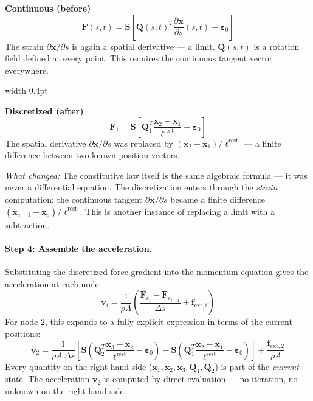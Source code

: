 \documentclass[11pt]{article}
\newcommand{\vect}[1]{\mathbf{#1}}
\newcommand{\mat}[1]{\mathbf{#1}}
\newcommand{\dds}[1]{\frac{\partial #1}{\partial s}}
\begin{document}
\begin{tcolorbox}[colback=white, colframe=black!40, title={\small Step 3 --- Continuous vs.\ discretized constitutive law}, fonttitle=\bfseries\small]
\begin{minipage}[t]{0.47\linewidth}
\centering\textbf{Continuous (before)}
\[
  \vect{F}(s, t) = \mat{S}\!\left[\mat{Q}(s,t)^T \dds{\vect{x}}(s,t) - \bm{\varepsilon}_0\right]
\]
The strain $\partial \vect{x}/\partial s$ is again a spatial derivative --- a limit.
$\mat{Q}(s,t)$ is a rotation field defined at every point.
This requires the continuous tangent vector everywhere.
\end{minipage}\hfill
\vrule width 0.4pt\hfill
\begin{minipage}[t]{0.47\linewidth}
\centering\textbf{Discretized (after)}
\[
  \vect{F}_1 = \mat{S}\!\left[\mat{Q}_1^T \frac{\vect{x}_2 - \vect{x}_1}{\ell^{\text{rest}}} - \bm{\varepsilon}_0\right]
\]
The spatial derivative $\partial \vect{x}/\partial s$ was replaced by $(\vect{x}_2 - \vect{x}_1)/\ell^{\text{rest}}$ --- a finite difference between two known position vectors.
\end{minipage}

\smallskip
\noindent\textit{What changed:} The constitutive law itself is the same algebraic formula --- it was never a differential equation.
The discretization enters through the \emph{strain} computation: the continuous tangent $\partial\vect{x}/\partial s$ became a finite difference $(\vect{x}_{e+1} - \vect{x}_e)/\ell^{\text{rest}}$.
This is another instance of replacing a limit with a subtraction.
\end{tcolorbox}

\paragraph{Step 4: Assemble the acceleration.}
Substituting the discretized force gradient into the momentum equation gives the acceleration at each node:
\begin{equation}
  \dot{\vect{v}}_i = \frac{1}{\rho A} \left( \frac{\vect{F}_{e_i} - \vect{F}_{e_{i-1}}}{\Delta s} + \vect{f}_{\text{ext},i} \right)
  \label{eq:accel-example}
\end{equation}
For node 2, this expands to a fully explicit expression in terms of the current positions:
\begin{equation}
  \dot{\vect{v}}_2 = \frac{1}{\rho A \,\Delta s} \left[
    \mat{S}\!\left(\mat{Q}_2^T \frac{\vect{x}_3 - \vect{x}_2}{\ell^{\text{rest}}} - \bm{\varepsilon}_0\right)
    - \mat{S}\!\left(\mat{Q}_1^T \frac{\vect{x}_2 - \vect{x}_1}{\ell^{\text{rest}}} - \bm{\varepsilon}_0\right)
  \right] + \frac{\vect{f}_{\text{ext},2}}{\rho A}
  \label{eq:node2-full}
\end{equation}
Every quantity on the right-hand side ($\vect{x}_1, \vect{x}_2, \vect{x}_3, \mat{Q}_1, \mat{Q}_2$) is part of the \emph{current} state.
The acceleration $\dot{\vect{v}}_2$ is computed by direct evaluation --- no iteration, no unknown on the right-hand side.
\end{document}
